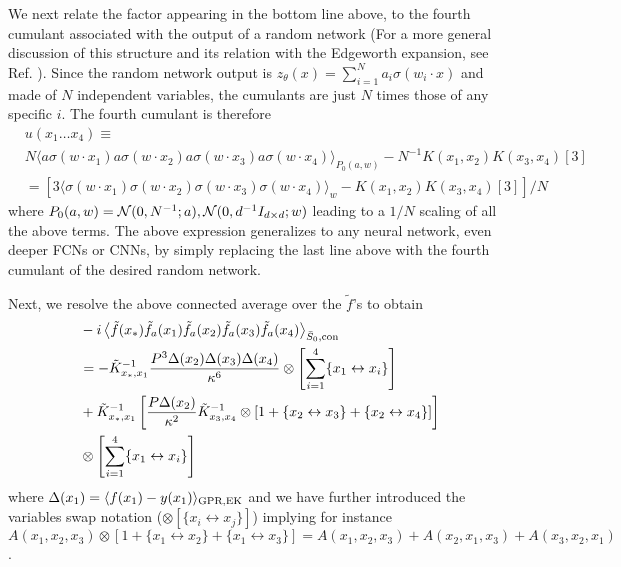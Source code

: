 We next relate the factor appearing in the bottom line above, to the fourth cumulant associated with the output of a random network (For a more general discussion of this structure and its relation with the Edgeworth expansion, see Ref. \cite{naveh2021predicting}). Since the random network output is $z_{\theta}(x)=\sum_{i=1}^N a_i \sigma({w}_i \cdot x)$ and made of $N$ independent variables, the cumulants are just $N$ times those of any specific $i$. The fourth cumulant is therefore  
\begin{align}
&u(x_1\ldots x_4) \equiv \\ \nonumber
&N \langle a \sigma({w} \cdot {x}_1) a \sigma({w} \cdot {x}_2) a \sigma({w} \cdot {x}_3) a \sigma({w} \cdot x_4) \rangle_{P_0(a,{w})} - N^{-1} K(x_1,x_2)K(x_3,x_4)[3] \\ \nonumber 
&= \left[3\langle  \sigma({w} \cdot {x}_1)  \sigma({w} \cdot {x}_2)  \sigma({w} \cdot {x}_3)  \sigma({w} \cdot {x}_4) \rangle_{w} - K(x_1,x_2)K(x_3,x_4)[3]\right]/N
\end{align}
where $P_0(a,{w}) =  {\cal N}(0,N^{-1};a),{\cal N}(0,d^{-1} I_{d\times d};w)$ leading to a $1/N$ scaling of all the above terms. The above expression generalizes to any neural network, even deeper FCNs or CNNs, by simply replacing the last line above with the fourth cumulant of the desired random network.

Next, we resolve the above connected average over the $\tilde{f}$'s to obtain 
\begin{align}
&\nonumber -i\left\langle \tilde{f}(x_*)   \tilde{f}_a(x_1) \tilde{f}_a(x_2) \tilde{f}_a(x_3) \tilde{f}_a(x_4)\right\rangle_{\bar{S}_0,\text{con}}  \\  
&=  -\tilde{K}^{-1}_{x_*,x_1} \frac{P^3\Delta(x_2)\Delta(x_3)\Delta(x_4)}{\kappa^{6}} \otimes \left[\sum_{i=1}^4 \{x_1 \leftrightarrow x_i\} \right] \\ \nonumber
&+\tilde{K}^{-1}_{x_*,x_1}\left[\frac{P\Delta(x_2)}{\kappa^2}\tilde{K}^{-1}_{x_3,x_4}\otimes[1+\{x_2 \leftrightarrow x_3\}+\{x_2 \leftrightarrow x_4\}]\right] \\ \nonumber 
&\otimes \left[\sum_{i=1}^4 \{x_1 \leftrightarrow x_i\}\right]
\end{align}
where $\Delta(x_1)=\langle f(x_1) - y(x_1)\rangle_{\text{GPR},\text{EK}}$  and we have further introduced the variables swap notation ($\otimes [\{x_i \leftrightarrow x_j\}]$) implying for instance $A(x_1,x_2,x_3) \otimes [1+\{x_1 \leftrightarrow x_2 \}+\{x_1 \leftrightarrow x_3\}]=A(x_1,x_2,x_3)+A(x_2,x_1,x_3)+A(x_3,x_2,x_1)$.

